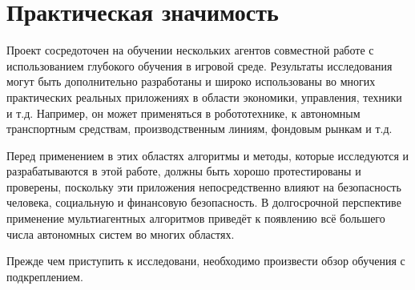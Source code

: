 \section{Практическая значимость} \label{intro:sec3}

Проект сосредоточен на обучении нескольких агентов совместной работе с использованием глубокого обучения в игровой среде. Результаты исследования могут быть дополнительно разработаны и широко использованы во многих практических реальных приложениях в области экономики, управления, техники и т.д. Например, он может применяться в робототехнике, к автономным транспортным средствам, производственным линиям, фондовым рынкам и т.д.

Перед применением в этих областях алгоритмы и методы, которые исследуются и разрабатываются в этой работе, должны быть хорошо протестированы и проверены, поскольку эти приложения непосредственно влияют на безопасность человека, социальную и финансовую безопасность. В долгосрочной перспективе применение мультиагентных алгоритмов приведёт к появлению всё большего числа автономных систем во многих областях.

Прежде чем приступить к исследовани, необходимо произвести обзор обучения с подкреплением.


